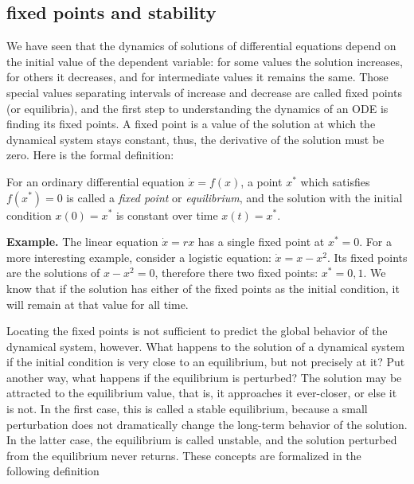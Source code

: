 \documentclass[
  letterpaper,
  DIV=11,
  numbers=noendperiod]{scrreprt}
\begin{document}
\hypertarget{fixed-points-and-stability}{%
\subsection{fixed points and
stability}\label{fixed-points-and-stability}}

We have seen that the dynamics of solutions of differential equations
depend on the initial value of the dependent variable: for some values
the solution increases, for others it decreases, and for intermediate
values it remains the same. Those special values separating intervals of
increase and decrease are called fixed points (or equilibria), and the
first step to understanding the dynamics of an ODE is finding its fixed
points. A fixed point is a value of the solution at which the dynamical
system stays constant, thus, the derivative of the solution must be
zero. Here is the formal definition:

\begin{tcolorbox}[enhanced jigsaw, arc=.35mm, colframe=quarto-callout-note-color-frame, left=2mm, opacitybacktitle=0.6, breakable, title=\textcolor{quarto-callout-note-color}{\faInfo}\hspace{0.5em}{Definition}, toprule=.15mm, coltitle=black, bottomtitle=1mm, toptitle=1mm, colback=white, leftrule=.75mm, colbacktitle=quarto-callout-note-color!10!white, titlerule=0mm, opacityback=0, rightrule=.15mm, bottomrule=.15mm]

For an ordinary differential equation \(\dot x = f(x)\), a point \(x^*\)
which satisfies \(f(x^*)=0\) is called a \emph{fixed point} or
\emph{equilibrium}, and the solution with the initial condition
\(x(0)=x^*\) is constant over time \(x(t)=x^*\).

\end{tcolorbox}

\textbf{Example.} The linear equation \(\dot x = rx\) has a single fixed
point at \(x^* = 0\). For a more interesting example, consider a
logistic equation: \(\dot x = x - x^2\). Its fixed points are the
solutions of \(x - x^2 = 0\), therefore there two fixed points:
\(x^* = 0, 1\). We know that if the solution has either of the fixed
points as the initial condition, it will remain at that value for all
time.

Locating the fixed points is not sufficient to predict the global
behavior of the dynamical system, however. What happens to the solution
of a dynamical system if the initial condition is very close to an
equilibrium, but not precisely at it? Put another way, what happens if
the equilibrium is perturbed? The solution may be attracted to the
equilibrium value, that is, it approaches it ever-closer, or else it is
not. In the first case, this is called a stable equilibrium, because a
small perturbation does not dramatically change the long-term behavior
of the solution. In the latter case, the equilibrium is called unstable,
and the solution perturbed from the equilibrium never returns. These
concepts are formalized in the following definition
\end{document}
